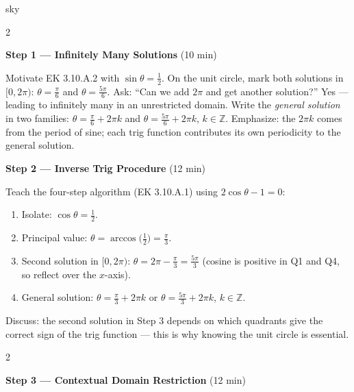 \documentclass[10pt]{article}
\begin{document}
\begin{skillbox}{sky}
\begin{multicols}{2}

\textbf{Step 1 --- Infinitely Many Solutions} (10 min)

Motivate EK 3.10.A.2 with $\sin\theta = \tfrac{1}{2}$.
On the unit circle, mark both solutions in $[0, 2\pi)$:
$\theta = \tfrac{\pi}{6}$ and $\theta = \tfrac{5\pi}{6}$.
Ask: ``Can we add $2\pi$ and get another solution?''
Yes --- leading to infinitely many in an unrestricted domain.
Write the \emph{general solution} in two families:
$\theta = \tfrac{\pi}{6} + 2\pi k$ and $\theta = \tfrac{5\pi}{6} + 2\pi k$,
$k \in \mathbb{Z}$.
Emphasize: the $2\pi k$ comes from the period of sine; each trig function
contributes its own periodicity to the general solution.

\columnbreak

\textbf{Step 2 --- Inverse Trig Procedure} (12 min)

Teach the four-step algorithm (EK 3.10.A.1) using $2\cos\theta - 1 = 0$:
\begin{enumerate}[leftmargin=1.2em, itemsep=1pt, topsep=2pt]
  \item Isolate: $\cos\theta = \tfrac{1}{2}$.
  \item Principal value: $\theta = \arccos\!\bigl(\tfrac{1}{2}\bigr) = \tfrac{\pi}{3}$.
  \item Second solution in $[0,2\pi)$: $\theta = 2\pi - \tfrac{\pi}{3} = \tfrac{5\pi}{3}$
    (cosine is positive in Q1 and Q4, so reflect over the $x$-axis).
  \item General solution: $\theta = \tfrac{\pi}{3} + 2\pi k$ or
    $\theta = \tfrac{5\pi}{3} + 2\pi k$, $k \in \mathbb{Z}$.
\end{enumerate}
Discuss: the second solution in Step 3 depends on which quadrants give the
correct sign of the trig function --- this is why knowing the unit circle is
essential.

\end{multicols}

\begin{multicols}{2}

\textbf{Step 3 --- Contextual Domain Restriction} (12 min)


\end{multicols}
\end{skillbox}
\end{document}
